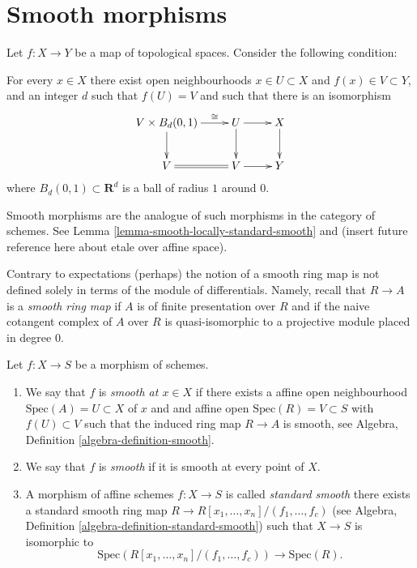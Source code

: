 \section{Smooth morphisms}
\label{section-smooth}

\noindent
Let $f : X \to Y$ be a map of topological spaces. Consider the following
condition:
\begin{list}{(*)}{}
\item For every $x \in X$ there exist open neighbourhoods
$x \in U \subset X$ and $f(x) \in V \subset Y$, and an integer $d$
such that $f(U) = V$ and such that there is an isomorphism
$$
\xymatrix{
V \times B_d(0, 1) \ar[r]^-{\cong} \ar[d] & U \ar[r] \ar[d] & X \ar[d] \\
V \ar@{=}[r] & V \ar[r] & Y
}
$$
where $B_d(0, 1) \subset \mathbf{R}^d$ is a ball of radius $1$ around $0$.
\end{list}
Smooth morphisms are the analogue of such morphisms in the category
of schemes. See Lemma \ref{lemma-smooth-locally-standard-smooth}
and (insert future reference here about
etale over affine space).

\medskip\noindent
Contrary to expectations (perhaps) the notion
of a smooth ring map is not defined solely in terms
of the module of differentials. Namely, recall that
$R \to A$ is a {\it smooth ring map} if $A$ is of finite presentation over $R$
and if the naive cotangent complex of $A$ over $R$ is quasi-isomorphic
to a projective module placed in degree $0$.

\begin{definition}
\label{definition-smooth}
Let $f : X \to S$ be a morphism of schemes.
\begin{enumerate}
\item We say that $f$ is {\it smooth at $x \in X$} if
there exists a affine open neighbourhood $\text{Spec}(A) = U \subset X$
of $x$ and and affine open $\text{Spec}(R) = V \subset S$
with $f(U) \subset V$ such that the induced ring map
$R \to A$ is smooth, see Algebra, Definition \ref{algebra-definition-smooth}.
\item We say that $f$ is {\it smooth} if it is smooth at every point of $X$.
\item A morphism of affine schemes $f : X \to S$
is called {\it standard smooth} there exists a standard smooth ring
map $R \to R[x_1, \ldots, x_n]/(f_1, \ldots, f_c)$ (see
Algebra, Definition \ref{algebra-definition-standard-smooth})
such that $X \to S$ is isomorphic to
$$
\text{Spec}(R[x_1, \ldots, x_n]/(f_1, \ldots, f_c)) \to \text{Spec}(R).
$$
\end{enumerate}
\end{definition}


